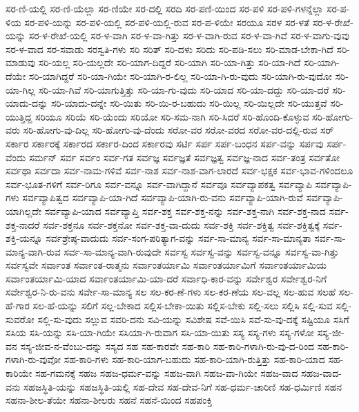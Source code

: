 {ಸರ-ಣಿ-ಯಲ್ಲಿ
ಸರ-ಣಿ-ಯೆಲ್ಲಾ
ಸರ-ಣಿಯೇ
ಸರ-ದಲ್ಲಿ
ಸರದಿ
ಸರ-ಪಣಿ-ಯಿಂದ
ಸರ-ಪಳಿ
ಸರ-ಪಳಿ-ಗಳನ್ನೆಲ್ಲಾ
ಸರ-ಪ-ಳಿಯ
ಸರ-ಪಳಿ-ಯನ್ನು
ಸರ-ಪಳಿ-ಯಲ್ಲಿ
ಸರ-ಪಳಿ-ಯಲ್ಲಿ-ರುವ
ಸರ-ಪ-ಳಿಯೇ
ಸರಯೂ
ಸರಳ
ಸರ-ಳತೆ
ಸರ-ಳ-ರೇಖೆ-ಯನ್ನು
ಸರ-ಳ-ರೇಖೆ-ಯಲ್ಲಿ
ಸರ-ಳ-ವಾಗಿ
ಸರ-ಳ-ವಾ-ಗಿತ್ತು
ಸರ-ಳ-ವಾಗಿ-ರುವ
ಸರ-ಳ-ವಾ-ಗಿವೆ
ಸರ-ಳ-ವಾಗು-ವುವು
ಸರ-ಳ-ವಾದ
ಸರ-ಸವಾಡು
ಸರಸ್ವತಿ-ಗಳು
ಸರಿ
ಸರಿತ್
ಸರಿ-ದಳು
ಸರಿದು
ಸರಿ-ಪಡಿ-ಸಲು
ಸರಿ-ಮಾಡ-ಬೇಕಾ-ಗಿದೆ
ಸರಿ-ಮಾಡುವು
ಸರಿ-ಯಲ್ಲ
ಸರಿ-ಯಲ್ಲದೇ
ಸರಿ-ಯಾಗ-ದಿದ್ದರೆ
ಸರಿ-ಯಾಗಿ
ಸರಿ-ಯಾ-ಗಿತ್ತು
ಸರಿ-ಯಾ-ಗಿದೆ
ಸರಿ-ಯಾಗಿ-ದೆಯೇ
ಸರಿ-ಯಾಗಿದ್ದರೆ
ಸರಿ-ಯಾ-ಗಿಯೇ
ಸರಿ-ಯಾಗಿ-ರ-ಲಿಲ್ಲ
ಸರಿ-ಯಾ-ಗಿ-ರು-ವುದು
ಸರಿ-ಯಾಗಿ-ರು-ವುದೋ
ಸರಿ-ಯಾ-ಗಿಲ್ಲ
ಸರಿ-ಯಾ-ಗಿವೆ
ಸರಿ-ಯಾಗುತ್ತಿತ್ತು
ಸರಿ-ಯಾ-ಗು-ವುದು
ಸರಿ-ಯಾದ
ಸರಿ-ಯಾ-ದದ್ದು
ಸರಿ-ಯಾ-ದರೆ
ಸರಿ-ಯಾದು-ದನ್ನು
ಸರಿ-ಯಾದು-ದನ್ನೇ
ಸರಿ-ಯಿತು
ಸರಿ-ಯಿ-ರ-ಬಹುದು
ಸರಿ-ಯಿಲ್ಲ
ಸರಿ-ಯಿಲ್ಲದೇ
ಸರಿ-ಯುತ್ತವೆ
ಸರಿ-ಯುತ್ತಿದ್ದ
ಸರಿಯೂ
ಸರಿಯೆ
ಸರಿ-ಯೆಂದು
ಸರಿಯೋ
ಸರಿ-ಸಮ-ನಾಗಿ
ಸರಿ-ಸಿದರೆ
ಸರಿ-ಹೊಂದಿ-ಕೊಳ್ಳುವ
ಸರಿ-ಹೋಗು-ವರು
ಸರಿ-ಹೋಗು-ವು-ದಿಲ್ಲ
ಸರಿ-ಹೋಗು-ವು-ದೆಂದು
ಸರೋ-ವರ
ಸರೋ-ವರದ
ಸರೋ-ವರ-ದಲ್ಲಿ-ರುವ
ಸರ್
ಸರ್ಕಾರ
ಸರ್ಕಾರಕ್ಕೆ
ಸರ್ಕಾರದ
ಸರ್ಕಾರ-ದಿಂದ
ಸರ್ಕಾರವು
ಸರ್ಟಿ
ಸರ್ಪ
ಸರ್ಪ-ಬಂಧನ
ಸರ್ಪ-ವನ್ನು
ಸರ್ಪವು
ಸರ್ಪ-ವೆಂದು
ಸರ್ಮನ್
ಸರ್ವ
ಸರ್ವಂ
ಸರ್ವ-ಗತ
ಸರ್ವಜ್ಞ
ಸರ್ವಜ್ಞತೆ
ಸರ್ವಜ್ಞತ್ವ
ಸರ್ವಜ್ಞ-ನಾದ
ಸರ್ವ-ತಂತ್ರ
ಸರ್ವತೋ
ಸರ್ವಥಾ
ಸರ್ವದಾ
ಸರ್ವ-ನಾಮ-ಗಳಿವೆ
ಸರ್ವ-ನಾಶ
ಸರ್ವ-ನಾಶ-ವಾಗ-ಲಾರದೆ
ಸರ್ವ-ಭಕ್ಷಕ
ಸರ್ವ-ಭಾವ-ಗಳಿಂದಲೂ
ಸರ್ವ-ಭೂತ-ಗಳಿಗೆ
ಸರ್ವ-ರಿಗೂ
ಸರ್ವ-ವನ್ನೂ
ಸರ್ವ-ವಾಗಿದ್ದಾನೆ
ಸರ್ವವೂ
ಸರ್ವವ್ಯಾಪಕತ್ವ
ಸರ್ವವ್ಯಾಪಿ
ಸರ್ವವ್ಯಾಪಿ-ಗಳು
ಸರ್ವವ್ಯಾಪಿತ್ವದ
ಸರ್ವವ್ಯಾಪಿ-ಯಾ-ಗಿದೆ
ಸರ್ವವ್ಯಾಪಿ-ಯಾಗಿ-ರು-ವನು
ಸರ್ವವ್ಯಾಪಿ-ಯಾಗಿ-ರುವೆ
ಸರ್ವವ್ಯಾಪಿ-ಯಾಗಿಲ್ಲದೇ
ಸರ್ವವ್ಯಾಪಿ-ಯಾದ
ಸರ್ವವ್ಯಾಪ್ತಿ
ಸರ್ವ-ಶಕ್ತ
ಸರ್ವ-ಶಕ್ತ-ನನ್ನು
ಸರ್ವ-ಶಕ್ತ-ನಾಗಿ
ಸರ್ವ-ಶಕ್ತ-ನಾದ
ಸರ್ವ-ಶಕ್ತ-ನಾದರೆ
ಸರ್ವ-ಶಕ್ತನೂ
ಸರ್ವ-ಶಕ್ತನೋ
ಸರ್ವ-ಶಕ್ತ-ವಾ-ದುದು
ಸರ್ವ-ಶಕ್ತಿ
ಸರ್ವ-ಶಕ್ತಿತ್ವ
ಸರ್ವ-ಶಕ್ತಿತ್ವಕ್ಕೆ
ಸರ್ವ-ಶಕ್ತಿ-ಯನ್ನೂ
ಸರ್ವಶ್ರೇಷ್ಠ-ವಾದುದು
ಸರ್ವ-ಸಂಗ-ಪರಿತ್ಯಾಗ-ವನ್ನು
ಸರ್ವ-ಸಾ-ಮಾನ್ಯ
ಸರ್ವ-ಸಾ-ಮಾನ್ಯತಾ
ಸರ್ವ-ಸಾ-ಮಾನ್ಯ-ವಾಗಿ-ರುವ
ಸರ್ವ-ಸಾ-ಮಾನ್ಯ-ವಾಗಿ-ರುವುದೇ
ಸರ್ವಸ್ವ
ಸರ್ವಸ್ವ-ವನ್ನು
ಸರ್ವಸ್ವ-ವನ್ನೂ
ಸರ್ವಸ್ವ-ವಾ-ಗಿತ್ತು
ಸರ್ವಸ್ವವೇ
ಸರ್ವಾಂತ
ಸರ್ವಾಂತ-ರಾತ್ಮನು
ಸರ್ವಾಂತರ್ಯಾಮಿ
ಸರ್ವಾಂತರ್ಯಾಮಿಗೆ
ಸರ್ವಾಂತರ್ಯಾಮಿಯ
ಸರ್ವಾಂತರ್ಯಾಮಿ-ಯಾದ
ಸರ್ವಾಂತರ್ಯಾಮಿ-ಯಾ-ದರೆ
ಸರ್ವಾಧಿ-ಕಾರ-ವನ್ನು
ಸರ್ವೇಶ್ವರ
ಸರ್ವೇಶ್ವರ-ನಿಗೆ
ಸರ್ವೇಶ್ವರ-ನಿ-ರು-ವನು
ಸರ್ವೇ-ಸಾ-ಮಾನ್ಯ
ಸಲ
ಸಲ-ಕರ-ಣೆ-ಗಳು
ಸಲ-ಕರ-ಣೆಯ
ಸಲ-ವಲ್ಲ
ಸಲ-ಹುವ
ಸಲಹೆ
ಸಲ-ಹೆ-ಗಾರ
ಸಲ-ಹೆ-ಯನ್ನು
ಸಲಿಗೆ
ಸಲ್ಲ-ಬೇಕಾದ
ಸಲ್ಲಿಸ-ಬೇಕಾ-ಯಿತು
ಸಲ್ಲಿಸ-ಬೇಕು
ಸಲ್ಲಿ-ಸಲು
ಸಲ್ಲಿಸಿ
ಸಲ್ಲಿ-ಸುವ
ಸಲ್ಲಿ-ಸುವರೋ
ಸಲ್ಲಿ-ಸು-ವುದು
ಸಲ್ಲುವ
ಸವರಿ-ದನು
ಸವಿ-ಯನ್ನು
ಸವಿಶೇಷ
ಸವೆ-ಯಿಸಿ
ಸವೆ-ಸು-ವು-ದಕ್ಕೆ
ಸಷ್ಟಿಯೂ
ಸಸಿಗೆ
ಸಸಿಯ
ಸಸಿ-ಯನ್ನು
ಸಸಿ-ಯಾ-ಗಿಯೇ
ಸಸಿಯಾ-ಗಿ-ರುವಾಗ
ಸಸಿ-ಯಾ-ಯಿತು
ಸಸ್ಯ
ಸಸ್ಯ-ಗಳು
ಸಸ್ಯ-ಗಳೋ
ಸಸ್ಯ-ಜೀ-ವನ
ಸಸ್ಯ-ಜೀವ-ನ-ವೆಂಬು-ದನ್ನು
ಸಸ್ಯದ
ಸಹ
ಸಹ-ಕಾರವೇ
ಸಹ-ಕಾರಿ
ಸಹ-ಕಾರಿ-ಗಳಾಗಿ-ರು-ವು-ದ-ರಿಂದ
ಸಹ-ಕಾರಿ-ಗಳಾಗಿ-ರು-ವುವೋ
ಸಹ-ಕಾರಿ-ಗಳು
ಸಹ-ಕಾರಿ-ಯಾಗ-ಬಹುದು
ಸಹ-ಕಾರಿ-ಯಾಗಿ-ರುತ್ತಿತ್ತು
ಸಹ-ಕಾರಿ-ಯಾದ
ಸಹ-ಕಾರಿಯೇ
ಸಹ-ಗಮನಕ್ಕೆ
ಸಹಜ
ಸಹಜ-ಧರ್ಮ-ವನ್ನು
ಸಹಜ-ವಾಗಿ
ಸಹಜ-ವಾ-ಗಿಯೇ
ಸಹಜ-ವಾದ
ಸಹಜ-ವಾದ-ವನು
ಸಹಜಸ್ಥಿತಿ-ಯನ್ನು
ಸಹಜಸ್ಥಿತಿ-ಯಲ್ಲಿ
ಸಹ-ದೇವ
ಸಹ-ದೇವ-ನಿಗೆ
ಸಹ-ಧರ್ಮ-ಚಾರಿಣಿ
ಸಹ-ಧರ್ಮಿಣಿ
ಸಹನ
ಸಹನಾ-ಶೀಲ-ತೆಯೇ
ಸಹನಾ-ಶೀಲರು
ಸಹನೆ
ಸಹನೆ-ಯಿಂದ
ಸಹಪಂಕ್ತಿ
}
